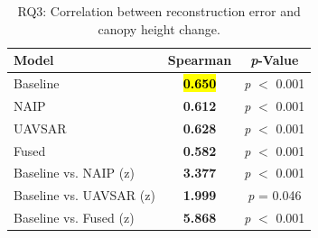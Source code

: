\documentclass[remotesensing,article,accept,pdftex,moreauthors]{Definitions/mdpi}
\begin{document}
\begin{table}[H]

\caption{RQ3: Correlation between reconstruction error and canopy height change.}
\begin{tabularx}{\textwidth}{lCC}
\toprule
\textbf{Model} & \textbf{Spearman \boldmath{$\rho$}} & \textbf{\textit{p}-Value} \\
\midrule
Baseline & \textbf{\hl{0.650} %
} & \emph{p} $<$ 0.001 \\
NAIP & \textbf{0.612} & \emph{p} $<$ 0.001 \\
UAVSAR & \textbf{0.628} & \emph{p} $<$ 0.001 \\
Fused & \textbf{0.582} & \emph{p} $<$ 0.001 \\
\midrule
Baseline vs. NAIP (z) & \textbf{3.377} & \emph{p} $<$ 0.001 \\
Baseline vs. UAVSAR (z) & \textbf{1.999} & \emph{p} = 0.046 \\
Baseline vs. Fused (z) & \textbf{5.868} & \emph{p} $<$ 0.001 \\
\bottomrule
\end{tabularx}
\label{tab:rq3_results}
\end{table}
\vspace{-10pt}
\end{document}
